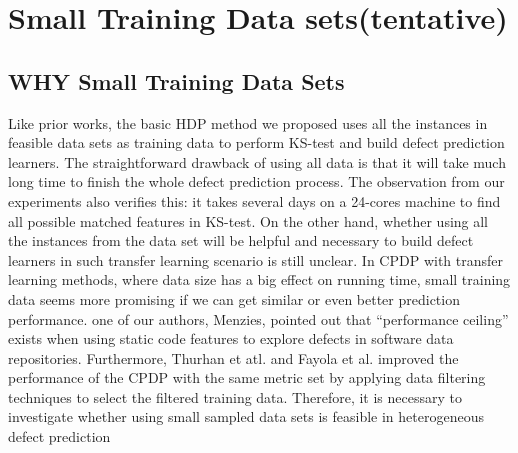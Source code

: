 \section{Small Training Data sets(tentative)}
\label{sec: small_data_sets}

\subsection{WHY Small Training Data Sets}
Like prior works\cite{nam2013transfer,ma2012transfer,rahman2012recalling,ryu2014value,zhang2014towards}, the basic HDP method we proposed uses all the instances in feasible data sets as training data to perform KS-test and build defect prediction learners. The straightforward drawback of using all data is that it will take much long time to finish the whole defect prediction process. The observation from our experiments also verifies this: it takes several days on a 24-cores machine to find all possible matched features in KS-test. On the other hand, whether using all the instances from the data set will be helpful and necessary to build defect learners in such transfer learning scenario is still unclear. In CPDP with transfer learning methods, where data size has a big effect on running time, small training data seems more promising if we can get similar or even better prediction performance. one of our authors, Menzies, pointed out that ``performance ceiling'' exists when using static code features to explore defects in software data repositories\cite{menzies2008implications}.  Furthermore, Thurhan et atl.\cite{turhan2009relative} and Fayola et al.\cite{peters2013better} improved the  performance of the CPDP with the same metric set by applying data filtering techniques to select the filtered training data. Therefore, it is necessary to investigate whether using small sampled data sets is feasible in heterogeneous defect prediction

